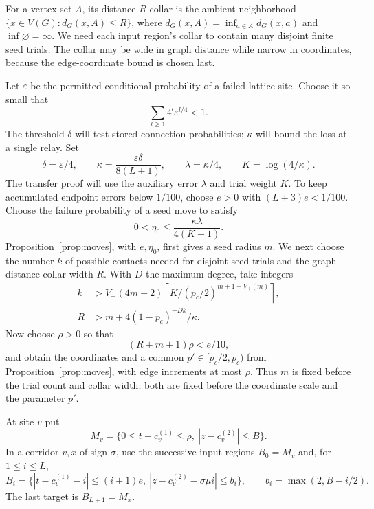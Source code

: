 \documentclass[11pt]{article}
\theoremstyle{definition}
\begin{document}
For a vertex set $A$, its distance-$R$ collar is the ambient
neighborhood $\{x\in V(G):d_G(x,A)\le R\}$, where
$d_G(x,A)=\inf_{a\in A}d_G(x,a)$ and $\inf\varnothing=\infty$.
We need each input region's collar to contain many disjoint finite
seed trials. The collar may be wide in graph distance while narrow in
coordinates, because the edge-coordinate bound is chosen last.

Let $\varepsilon$ be the permitted conditional probability of a failed
lattice site. Choose it so small that
\begin{equation}\label{eq:directed-contour-series}
 \sum_{l\ge1}4^l\varepsilon^{l/4}<1.
\end{equation}
The threshold $\delta$ will test stored connection probabilities;
$\kappa$ will bound the loss at a single relay. Set
\[
 \delta=\varepsilon/4,\qquad
 \kappa=\frac{\varepsilon\delta}{8(L+1)},\qquad
 \lambda=\kappa/4,\qquad K=\log(4/\kappa).
\]
The transfer proof will use the auxiliary error $\lambda$ and trial
weight $K$. To keep accumulated endpoint errors below $1/100$, choose
$e>0$ with $(L+3)e<1/100$. Choose the failure probability of a seed
move to satisfy
\[
 0<\eta_0\le\frac{\kappa\lambda}{4(K+1)}.
\]
Proposition~\ref{prop:moves}, with $e,\eta_0$, first gives a seed
radius $m$. We next choose the number $k$ of possible contacts needed
for disjoint seed trials and the graph-distance collar width $R$.
With $D$ the maximum degree, take integers
\begin{equation}\label{eq:corridor-trial-scales}
 \begin{split}
 k&>V_+(4m+2)
       \left\lceil K/(p_c/2)^{m+1+V_+(m)}\right\rceil,\\
 R&>m+4(1-p_c)^{-Dk}/\kappa.
 \end{split}
\end{equation}
Now choose $\rho>0$ so that
\begin{equation}\label{eq:corridor-coordinate-step}
 (R+m+1)\rho<e/10,
\end{equation}
and obtain the coordinates and a common $p'\in[p_c/2,p_c)$ from
Proposition~\ref{prop:moves}, with edge increments at most $\rho$.
Thus $m$ is fixed before the trial count and collar width; both are
fixed before the coordinate scale and the parameter $p'$.

At site $v$ put
\[
 M_v=\{0\le t-c_v^{(1)}\le\rho,\
                   |z-c_v^{(2)}|\le B\}.
\]
In a corridor $v,x$ of sign $\sigma$, use the successive input regions
$B_0=M_v$ and, for $1\le i\le L$,
\begin{equation}\label{eq:relay-regions}
 B_i=\{|t-c_v^{(1)}-i|\le(i+1)e,\
 |z-c_v^{(2)}-\sigma\mu i|\le b_i\},
 \qquad b_i=\max(2,B-i/2).
\end{equation}
The last target is $B_{L+1}=M_x$.
\end{document}
